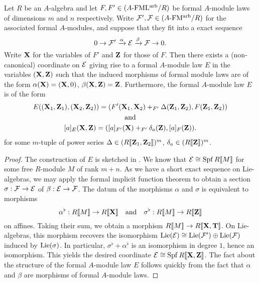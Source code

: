 \documentclass[../main.tex]{subfiles}
\begin{document}
\begin{lem}\label{lem:SESStandardForm}
  Let $R$ be an $A$-algebra and let $F, F' \in {({A}\text-\allowbreak\mathrm{FML^{arb}}/{R})}$ be 
  formal $A$-module laws of dimensions $m$ and $n$ respectively. Write 
  $\mathcal{F}', \mathcal{F} \in {({A}\text-\allowbreak\mathrm{FM^{arb}}/{R})}$ for the associated formal $A$-modules,
  and suppose that they fit into a exact sequence
  \begin{equation*}
    0 \to \mathcal{F}' \xrightarrow{\alpha} \mathcal{E} \xrightarrow{\beta} \mathcal{F} \to 0.
  \end{equation*}
  Write $\mathbf{X}$ for the variables of $F'$ and $\mathbf{Z}$ for those of $F$. Then 
  there exists a (non-canonical) coordinate on $\mathcal{E}$ giving rise to a formal
  $A$-module law $E$ in the variables $(\mathbf{X}, \mathbf{Z})$ such that the induced morphisms
  of formal module laws are of the form 
  $\alpha(\mathbf{X}) = (\mathbf{X}, 0)$, $\beta(\mathbf{X}, \mathbf{Z}) = \mathbf{Z}$. Furthermore, 
  the formal $A$-module law $E$ is of the form
  \begin{equation}\label{eq:SESStandardFormModuleLaw}
  \begin{gathered}
    E((\mathbf{X}_1, \mathbf{Z}_1), (\mathbf{X}_2, \mathbf{Z}_2)) = (F'(\mathbf{X}_1, \mathbf{X}_2) +_{F'} \Delta(\mathbf{Z}_1,
    \mathbf{Z}_2) , F(\mathbf{Z}_1, \mathbf{Z}_2)) \\
    \text{and} \\
    [a]_E(\mathbf{X}, \mathbf{Z}) = ([a]_{F'}(\mathbf{X}) +_{F'} \delta_a(\mathbf{Z}), [a]_F(\mathbf{Z})).
  \end{gathered}
  \end{equation}
  for some $m$-tuple of power series $\Delta \in (R\llbracket \mathbf{Z}_1, \mathbf{Z}_2 \rrbracket)^m$,
  $\delta_a \in (R\llbracket \mathbf{Z} \rrbracket)^m$. 
\begin{proof}
  The construction of $E$ is sketched in \cite[Proposition
  6.5]{hopkins1994equivariant}. We know that $\mathcal{E} \cong \operatorname{Spf} R\llbracket M \rrbracket$ 
  for some free $R$-module $M$ of rank $m+n$. As we have a short 
  exact sequence on Lie-algebras, we may apply the formal implicit function
  theorem  to obtain a section 
  $\sigma: \mathcal{F} \to \mathcal{E}$ of $\beta:\mathcal{E} \to \mathcal{F}$. 
  The datum of the morphisms $\alpha$ and $\sigma$ is equivalent to 
  morphisms
  \begin{equation*}
    \alpha^\flat: R \llbracket M \rrbracket \to R \llbracket \mathbf{X} \rrbracket \quad \text{and} \quad
    \sigma^\flat: R \llbracket M \rrbracket \to R \llbracket \mathbf{Z} \rrbracket
  \end{equation*}
  on affines. Taking their sum, we obtain a morphism $R \llbracket M \rrbracket
  \to R\llbracket \mathbf{X}, \mathbf{T} \rrbracket$. On Lie-algebras, this morphism recovers the
  isomorphism $\operatorname{Lie}(\mathcal{E}) \cong \operatorname{Lie}(\mathcal{F}') \oplus \operatorname{Lie}(\mathcal{F})$ induced by 
  $\operatorname{Lie}(\sigma)$. In particular, $\sigma^\flat + \alpha^\flat$ is an isomorphism
  in degree $1$, hence an isomorphism. This yields the desired
  coordinate $\mathcal{E} \cong \operatorname{Spf} R\llbracket \mathbf{X}, \mathbf{Z}\rrbracket$. The fact about the 
  structure of the formal $A$-module law $E$ follows quickly from the fact that 
  $\alpha$ and $\beta$ are morphisms of formal $A$-module laws. 
\end{proof}
\end{lem}
\end{document}
